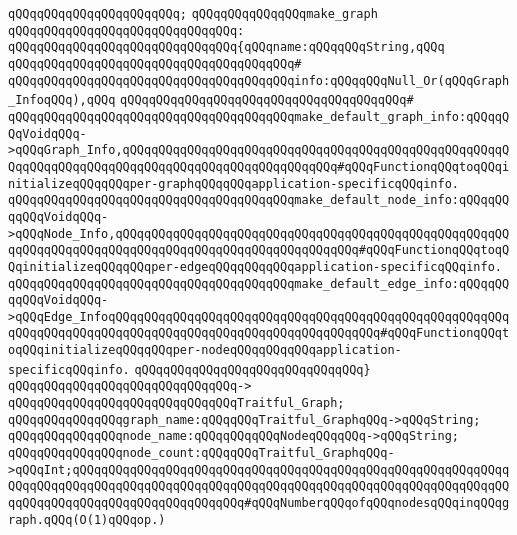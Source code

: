 \verb|qQQqqQQqqQQqqQQqqQQqqQQq;|\newline
\newline
\verb|qQQqqQQqqQQqqQQqmake_graph|\newline
\verb|qQQqqQQqqQQqqQQqqQQqqQQqqQQqqQQq:|\newline
\verb|qQQqqQQqqQQqqQQqqQQqqQQqqQQqqQQq{qQQqname:qQQqqQQqString,qQQq|\newline
\verb|qQQqqQQqqQQqqQQqqQQqqQQqqQQqqQQqqQQqqQQq#|\newline
\verb|qQQqqQQqqQQqqQQqqQQqqQQqqQQqqQQqqQQqqQQqinfo:qQQqqQQqNull_Or(qQQqGraph_InfoqQQq),qQQq|\newline
\verb|qQQqqQQqqQQqqQQqqQQqqQQqqQQqqQQqqQQqqQQq#|\newline
\verb|qQQqqQQqqQQqqQQqqQQqqQQqqQQqqQQqqQQqqQQqmake_default_graph_info:qQQqqQQqVoidqQQq->qQQqGraph_Info,qQQqqQQqqQQqqQQqqQQqqQQqqQQqqQQqqQQqqQQqqQQqqQQqqQQqqQQqqQQqqQQqqQQqqQQqqQQqqQQqqQQqqQQqqQQqqQQqqQQq#qQQqFunctionqQQqtoqQQqinitializeqQQqqQQqper-graphqQQqqQQqapplication-specificqQQqinfo.|\newline
\verb|qQQqqQQqqQQqqQQqqQQqqQQqqQQqqQQqqQQqqQQqmake_default_node_info:qQQqqQQqqQQqVoidqQQq->qQQqNode_Info,qQQqqQQqqQQqqQQqqQQqqQQqqQQqqQQqqQQqqQQqqQQqqQQqqQQqqQQqqQQqqQQqqQQqqQQqqQQqqQQqqQQqqQQqqQQqqQQqqQQqqQQq#qQQqFunctionqQQqtoqQQqinitializeqQQqqQQqper-edgeqQQqqQQqqQQqapplication-specificqQQqinfo.|\newline
\verb|qQQqqQQqqQQqqQQqqQQqqQQqqQQqqQQqqQQqqQQqmake_default_edge_info:qQQqqQQqqQQqVoidqQQq->qQQqEdge_InfoqQQqqQQqqQQqqQQqqQQqqQQqqQQqqQQqqQQqqQQqqQQqqQQqqQQqqQQqqQQqqQQqqQQqqQQqqQQqqQQqqQQqqQQqqQQqqQQqqQQqqQQqqQQq#qQQqFunctionqQQqtoqQQqinitializeqQQqqQQqper-nodeqQQqqQQqqQQqapplication-specificqQQqinfo.|\newline
\verb|qQQqqQQqqQQqqQQqqQQqqQQqqQQqqQQq}|\newline
\verb|qQQqqQQqqQQqqQQqqQQqqQQqqQQqqQQq->|\newline
\verb|qQQqqQQqqQQqqQQqqQQqqQQqqQQqqQQqTraitful_Graph;|\newline
\newline
\verb|qQQqqQQqqQQqqQQqgraph_name:qQQqqQQqTraitful_GraphqQQq->qQQqString;|\newline
\verb|qQQqqQQqqQQqqQQqnode_name:qQQqqQQqqQQqNodeqQQqqQQq->qQQqString;|\newline
\verb|qQQqqQQqqQQqqQQqnode_count:qQQqqQQqTraitful_GraphqQQq->qQQqInt;qQQqqQQqqQQqqQQqqQQqqQQqqQQqqQQqqQQqqQQqqQQqqQQqqQQqqQQqqQQqqQQqqQQqqQQqqQQqqQQqqQQqqQQqqQQqqQQqqQQqqQQqqQQqqQQqqQQqqQQqqQQqqQQqqQQqqQQqqQQqqQQqqQQqqQQqqQQqqQQqqQQq#qQQqNumberqQQqofqQQqnodesqQQqinqQQqgraph.qQQq(O(1)qQQqop.)|\newline
